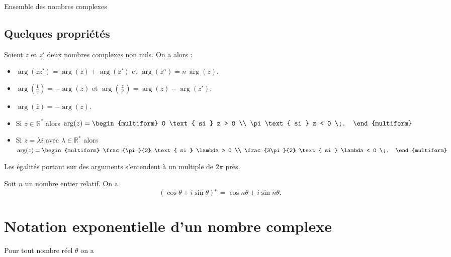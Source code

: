 \begin{chapter}{Ensemble des nombres complexes}
\subsection{Quelques propri\'et\'es}
\begin{prop}
	\label{prop:argument}
	Soient $z$ et $z'$ deux nombres complexes non nuls. On a alors :
	\begin{itemize}
		\item $\arg(z z') = \arg(z) + \arg(z')$ et $\arg(z^n) = n \, \arg(z)$,
		\item $\arg \left(\frac{1}{z} \right) = - \arg(z)$ 
		      et $\arg\left(\frac{z}{z'}\right) = \arg(z) - \arg(z')$,
		\item $\arg(\bar{z}) = - \arg(z)$.
		\item Si $z \in \mathbb{R}^*$ alors 
		      $\arg(z) = 
		            \begin{multiform}
		                  0 \text{ si } z > 0 \\
		                  \pi \text{ si } z < 0 \;.
		            \end{multiform}
		      $
		\item Si $z = \lambda i$ avec $\lambda \in \mathbb{R}^*$ alors 
		      $\arg(z) = 
		            \begin{multiform}
		                  \frac{\pi}{2} \text{ si } \lambda > 0 \\
		                  \frac{3\pi}{2} \text{ si } \lambda < 0 \;.
		            \end{multiform}
		      $
	\end{itemize}
	Les \'egalit\'es portant sur des arguments s'entendent \`a un multiple de $2\pi$ pr\`es.
\end{prop}

\begin{thm}[Formule de MOIVRE]
	\label{thm:Moivre}
	Soit $n$ un nombre entier relatif. On a
	$$ (\cos \theta + i \sin \theta)^n = \cos n \theta + i \sin n \theta .$$
\end{thm}

\section{Notation exponentielle d'un nombre complexe}
%
%
\begin{thm}
\label{thm:Expo-trigo}
Pour tout nombre r\'eel $\theta$ on a


\end{thm}
\end{chapter}
